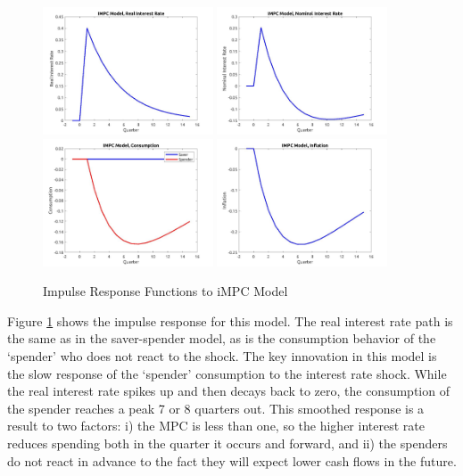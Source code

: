 \documentclass[AER]{AEA}
\begin{document}
\begin{figure}
	\includegraphics[width=0.45\textwidth]{../Code/Dynare/Figures/RealRateIMPC.jpg}
	\includegraphics[width=0.45\textwidth]{../Code/Dynare/Figures/NominalRateIMPC.jpg}
	\includegraphics[width=0.45\textwidth]{../Code/Dynare/Figures/ConsumptionIMPC.jpg}
	\includegraphics[width=0.45\textwidth]{../Code/Dynare/Figures/InflationIMPC.jpg}
	\caption{Impulse Response Functions to iMPC Model}
	\label{fig:IRFIMPC}
\end{figure}

Figure \ref{fig:IRFIMPC} shows the impulse response for this model. The real interest rate path is the same as in the saver-spender model, as is the consumption behavior of the `spender' who does not react to the shock. The key innovation in this model is the slow response of the `spender' consumption to the interest rate shock. While the real interest rate spikes up and then decays back to zero, the consumption of the spender reaches a peak 7 or 8 quarters out. This smoothed response is a result to two factors: i) the MPC is less than one, so the higher interest rate reduces spending both in the quarter it occurs and forward, and ii) the spenders do not react in advance to the fact they will expect lower cash flows in the future.
\end{document}
